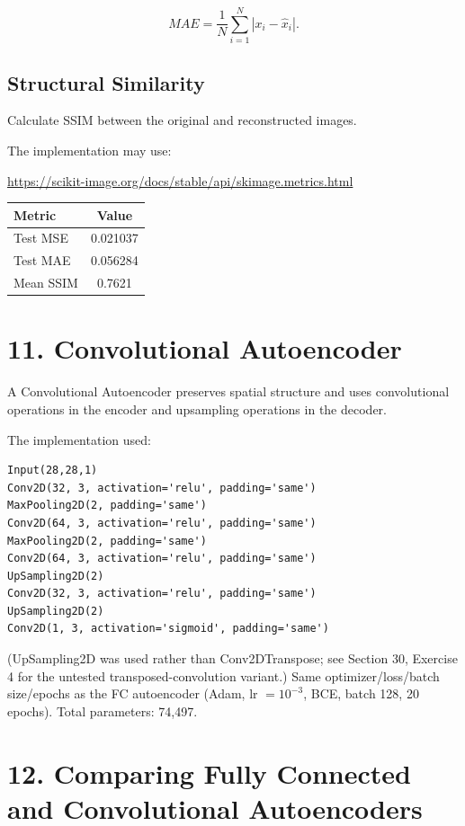 \documentclass[10pt]{article}
\begin{document}
\[
MAE=
\frac{1}{N}
\sum_{i=1}^{N}
|x_i-\hat{x}_i|.
\]

\subsection*{Structural Similarity}

Calculate SSIM between the original and reconstructed images.

The implementation may use:

\url{https://scikit-image.org/docs/stable/api/skimage.metrics.html}

\begin{center}
\begin{tabular}{|l|c|}
\hline
Metric & Value\\
\hline
Test MSE & 0.021037\\
Test MAE & 0.056284\\
Mean SSIM & 0.7621\\
\hline
\end{tabular}
\end{center}

\section*{11. Convolutional Autoencoder}

A Convolutional Autoencoder preserves spatial structure and uses convolutional
operations in the encoder and upsampling operations in the decoder.

The implementation used:

\begin{verbatim}
Input(28,28,1)
Conv2D(32, 3, activation='relu', padding='same')
MaxPooling2D(2, padding='same')
Conv2D(64, 3, activation='relu', padding='same')
MaxPooling2D(2, padding='same')
Conv2D(64, 3, activation='relu', padding='same')
UpSampling2D(2)
Conv2D(32, 3, activation='relu', padding='same')
UpSampling2D(2)
Conv2D(1, 3, activation='sigmoid', padding='same')
\end{verbatim}

(UpSampling2D was used rather than Conv2DTranspose; see Section 30, Exercise 4
for the untested transposed-convolution variant.) Same optimizer/loss/batch
size/epochs as the FC autoencoder (Adam, lr $=10^{-3}$, BCE, batch 128, 20
epochs). Total parameters: 74{,}497.

\section*{12. Comparing Fully Connected and Convolutional Autoencoders}
\end{document}
